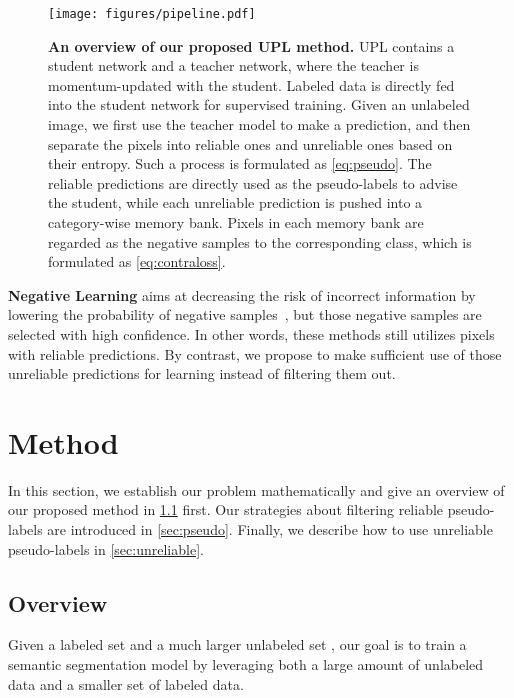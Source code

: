 \documentclass[10pt, twocolumn, letterpaper]{article}
\begin{document}
\begin{figure*}[t]
    \centering
    \texttt{[image: figures/pipeline.pdf]}
    \caption{
        \textbf{An overview of our proposed UPL method.} 
UPL contains a student network and a teacher network, where the teacher is momentum-updated with the student.
Labeled data is directly fed into the student network for supervised training.
Given an unlabeled image, we first use the teacher model to make a prediction, and then separate the pixels into reliable ones and unreliable ones based on their entropy.
Such a process is formulated as \cref{eq:pseudo}.
The reliable predictions are directly used as the pseudo-labels to advise the student, while each unreliable prediction is pushed into a category-wise memory bank.
Pixels in each memory bank are regarded as the negative samples to the corresponding class, which is formulated as \cref{eq:contraloss}.
    }
    \label{fig:pipeline}
    \vspace{-15pt}
\end{figure*}


\noindent\textbf{Negative Learning} aims at decreasing the risk of incorrect information by  lowering the probability of negative samples~\cite{kim2019nlnl, tokunaga2020negative, ups, kim2021joint}, but those negative samples are selected with high confidence.
In other words, these methods still utilizes pixels with reliable predictions.
By contrast, we propose to make sufficient use of those unreliable predictions for learning instead of filtering them out.





\section{Method}\label{sec:method}


In this section, we establish our problem mathematically and give an overview of our proposed method in \cref{sec:overview} first. Our strategies about filtering reliable pseudo-labels are introduced in \cref{sec:pseudo}. Finally, we describe how to use unreliable pseudo-labels in \cref{sec:unreliable}.


\subsection{Overview}\label{sec:overview}


Given a labeled set  and a much larger unlabeled set ,
our goal is to train a semantic segmentation model by leveraging both a large amount of unlabeled data and a smaller set of labeled data. 
\end{document}
